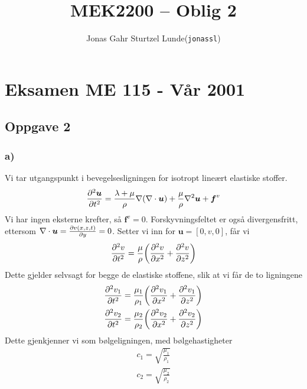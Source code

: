 \documentclass[12p,a4paper]{article}
\renewcommand{\b}{\boldsymbol}
\begin{document}
\title{MEK2200 -- Oblig 2}
\author{
    \begin{tabular}{r l}
        Jonas Gahr Sturtzel Lunde & (\texttt{jonassl})
    \end{tabular}}

\maketitle

\hspace{10cm}


\section*{Eksamen ME 115 - Vår 2001}
\subsection*{Oppgave 2}
\subsubsection*{a)}
Vi tar utgangspunkt i bevegelsesligningen for isotropt lineært elastiske stoffer.
\begin{align}\label{eqn:bev_lig}
    \pdv[2]{\b u}{t} = \frac{\lambda + \mu}{\rho}\nabla(\nabla\cdot\b u) + \frac{\mu}{\rho}\nabla^2\b u + \b f^v
\end{align}
Vi har ingen eksterne krefter, så $\b f^v = 0$. Forskyvningsfeltet er også divergensfritt, ettersom $\nabla \cdot \b u = \pdv{v(x,z,t)}{y} = 0$. Setter vi inn for $\b u = [0, v, 0]$, får vi
\begin{align}\label{eqn:wave}
    \pdv[2]{v}{t} = \frac{\mu}{\rho}\qty(\pdv[2]{v}{x} + \pdv[2]{v}{z})
\end{align}
Dette gjelder selvsagt for begge de elastiske stoffene, slik at vi får de to ligningene
\begin{align}
    \label{eqn:wave1}
    \pdv[2]{v_1}{t} = \frac{\mu_1}{\rho_1}\qty(\pdv[2]{v_1}{x} + \pdv[2]{v_1}{z}) \\
    \label{eqn:wave2}
    \pdv[2]{v_2}{t} = \frac{\mu_2}{\rho_2}\qty(\pdv[2]{v_2}{x} + \pdv[2]{v_2}{z})
\end{align}
Dette gjenkjenner vi som bølgeligningen, med bølgehastigheter
\begin{align}
    c_1 = \sqrt{\frac{\mu_1}{\rho_1}} \\
    c_2 = \sqrt{\frac{\mu_2}{\rho_2}}
\end{align}
\end{document}

